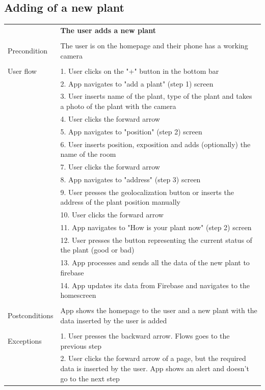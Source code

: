 \documentclass[10pt]{article}
\begin{document}
    \subsection{Adding of a new plant}
    \begin{tabular}{ p{3cm}|p{8cm} }
     & \textbf{The user adds a new plant} \\
     \\
     Precondition & The user is on the homepage and their phone has a working camera \\ 
     \\
     User flow 
     & 1. User clicks on the "+" button in the bottom bar \\
     & 2. App navigates to "add a plant" (step 1) screen\\ 
     & 3. User inserts name of the plant, type of the plant and takes a photo of the plant with the camera  \\
     & 4. User clicks the forward arrow\\
     & 5. App navigates to "position" (step 2) screen \\
     & 6. User inserts position, exposition and adds (optionally) the name of the room \\
     & 7. User clicks the forward arrow \\
     & 8. App navigates to "address" (step 3) screen \\
     & 9. User presses the geolocalization button or inserts the address of the plant position manually \\
     & 10. User clicks the forward arrow \\
     & 11. App navigates to "How is your plant now" (step 2) screen \\
     & 12. User presses the button representing the current status of the plant (good or bad) \\
     & 13. App processes and sends all the data of the new plant to firebase \\
     & 14. App updates its data from Firebase and navigates to the homescreen \\
     \\
     Postconditions & App shows the homepage to the user and a new plant with the data inserted by the user is added \\
     \\
     Exceptions 
     & 1. User presses the backward arrow. Flows goes to the previous step\\
     & 2. User clicks the forward arrow of a page, but the required data is inserted by the user. App shows an alert and doesn't go to the next step\\
    \end{tabular}
    \newline
    \newline
    \newline
\end{document}
